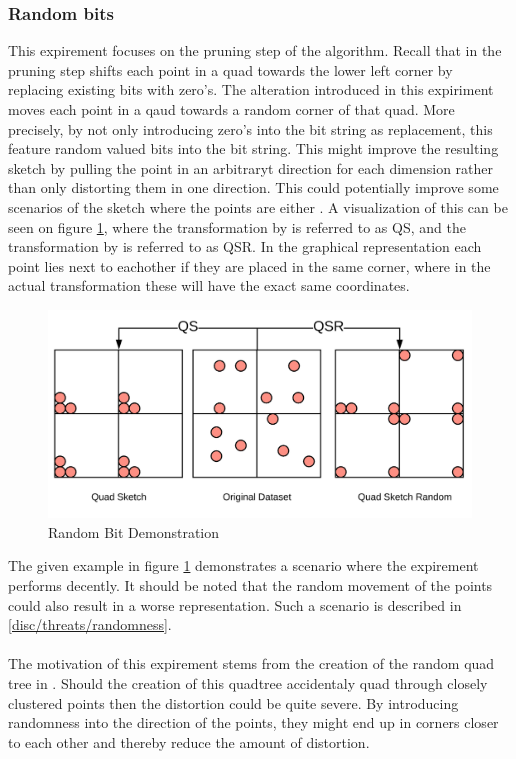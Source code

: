 \subsubsection{Random bits}
This expirement focuses on the pruning step of the algorithm. Recall that in the pruning step \qs{} shifts each point in a quad towards the lower left corner by replacing existing bits with zero's. The alteration introduced in this expiriment moves each point in a qaud towards a random corner of that quad. More precisely, by not only introducing zero's into the bit string as replacement, this feature random valued bits into the bit string. This might improve the resulting sketch by pulling the point in an arbitraryt direction for each dimension rather than only distorting them in one direction.  This could potentially improve some scenarios of the sketch where the points are either . A visualization of this can be seen on figure \ref{fig:randombits}, where the transformation by \qs{} is referred to as QS, and the transformation by \qsr{} is referred to as QSR. In the graphical representation each point lies next to eachother if they are placed in the same corner, where in the actual transformation these will have the exact same coordinates. 
\begin{figure}[h]
	\includegraphics[width=1\textwidth]{figures/randombits}
	\caption{Random Bit Demonstration}
	\label{fig:randombits}
\end{figure}
The given example in figure \ref{fig:randombits} demonstrates a scenario where the expirement performs decently. It should be noted that the random movement of the points could also result in a worse representation. Such a scenario is described in \ref{disc/threats/randomness}.
\\
\\
The motivation of this expirement stems from the creation of the random quad tree in \qs{}. Should the creation of this quadtree accidentaly quad through closely clustered points then the distortion could be quite severe. By introducing randomness into the direction of the points, they might end up in corners closer to each other and thereby reduce the amount of distortion.  


